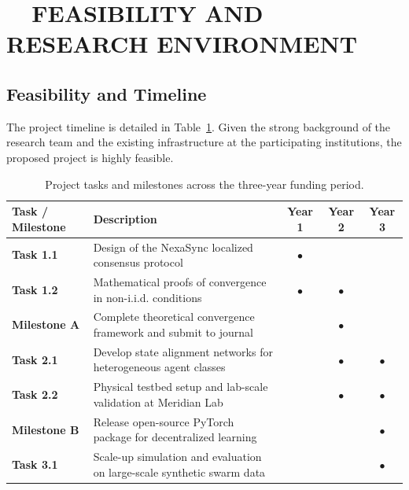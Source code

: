 \section{\texorpdfstring{\faUsers\ \ }{ }FEASIBILITY AND RESEARCH ENVIRONMENT}
\subsection{Feasibility and Timeline}
The project timeline is detailed in Table~\ref{tab:timeline}. Given the strong background of the research team and the existing infrastructure at the participating institutions, the proposed project is highly feasible.

\begin{table}[htbp]
    \centering
    \small
    \caption{Project tasks and milestones across the three-year funding period.}
    \label{tab:timeline}
    \begin{tabularx}{\textwidth}{l X c c c}
        \toprule
        \textbf{Task / Milestone} & \textbf{Description} & \textbf{Year 1} & \textbf{Year 2} & \textbf{Year 3} \\
        \midrule
        \textbf{Task 1.1} & Design of the NexaSync localized consensus protocol & $\bullet$ & & \\
        \textbf{Task 1.2} & Mathematical proofs of convergence in non-i.i.d. conditions & $\bullet$ & $\bullet$ & \\
        \textbf{Milestone A} & Complete theoretical convergence framework and submit to journal & & $\bullet$ & \\
        \textbf{Task 2.1} & Develop state alignment networks for heterogeneous agent classes & & $\bullet$ & $\bullet$ \\
        \textbf{Task 2.2} & Physical testbed setup and lab-scale validation at Meridian Lab & & $\bullet$ & $\bullet$ \\
        \textbf{Milestone B} & Release open-source PyTorch package for decentralized learning & & & $\bullet$ \\
        \textbf{Task 3.1} & Scale-up simulation and evaluation on large-scale synthetic swarm data & & & $\bullet$ \\
        \bottomrule
    \end{tabularx}
\end{table}

